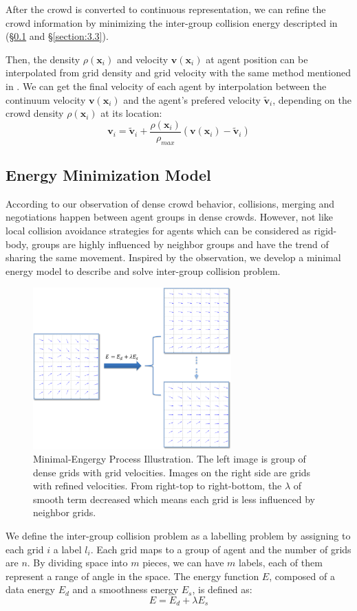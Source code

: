After the crowd is converted to continuous representation, we can refine the crowd information by minimizing the inter-group collision energy descripted in (\S\ref{section:3.2} and \S\ref{section:3.3}).

Then, the density $\rho(\textbf{x}_i)$ and velocity $\textbf{v}(\textbf{x}_i)$ at agent position can be interpolated from grid density and grid velocity with the same method mentioned in \cite{Treuille:2006}. We can get the final velocity of each agent by interpolation between the continuum velocity $\textbf{v}(\textbf{x}_i)$ and the agent's prefered velocity $\tilde{\textbf{v}}_i$, depending on the crowd density $\rho(\textbf{x}_i)$ at its location:
\begin{equation}
\label{eq:3}
\textbf{v}_i = \tilde{\textbf{v}}_i + \frac{\rho(\textbf{x}_i)}{\rho_{max}}(\textbf{v}(\textbf{x}_i) - \tilde{\textbf{v}}_i)
\end{equation}

\subsection{Energy Minimization Model}
\label{section:3.2}
According to our observation of dense crowd behavior, collisions, merging and negotiations happen between agent groups in dense crowds. However, not like local collision avoidance strategies for agents which can be considered as rigid-body, groups are highly influenced by neighbor groups and have the trend of sharing the same movement. Inspired by the observation, we develop a minimal energy model to describe and solve inter-group collision problem.

\begin{figure}
\centering
  \includegraphics[width=3in]{images/energy}
  \caption{Minimal-Engergy Process Illustration. The left image is group of dense grids with grid velocities. Images on the right side are grids with refined velocities. From right-top to right-bottom, the $\lambda$ of smooth term decreased which means each grid is less influenced by neighbor grids.}
\end{figure}
We define the inter-group collision problem as a labelling problem by assigning to each grid $i$ a label $l_i$. Each grid maps to a group of agent and the number of grids are $n$. By dividing space into $m$ pieces, we can have $m$ labels, each of them represent a range of angle in the space. The energy function $E$, composed of a data energy $E_d$ and a smoothness energy $E_s$, is defined as:
\begin{equation}
\label{eq:4}
E = E_d + \lambda E_s
\end{equation}

